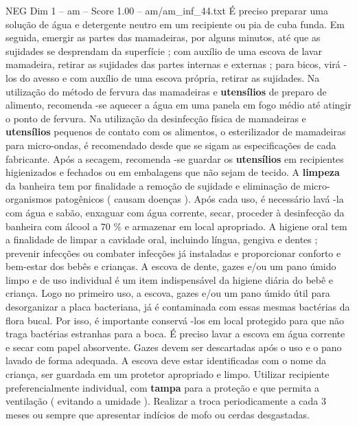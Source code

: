 \begin{textsample}{NEG Dim 1 – am – Score 1.00 – am/am\_inf\_44.txt}
É preciso preparar uma solução de água e detergente neutro em um recipiente ou pia de cuba funda.
Em seguida, emergir as partes das mamadeiras, por alguns minutos, até que as sujidades se desprendam da superfície ; com auxílio de uma escova de lavar mamadeira, retirar as sujidades das partes internas e externas ; para bicos, virá -los do avesso e com auxílio de uma escova própria, retirar as sujidades.
Na utilização do método de fervura das mamadeiras e \textbf{utensílios} de preparo de alimento, recomenda -se aquecer a água em uma panela em fogo médio até atingir o ponto de fervura.
Na utilização da desinfecção física de mamadeiras e \textbf{utensílios} pequenos de contato com os alimentos, o esterilizador de mamadeiras para micro-ondas, é recomendado desde que se sigam as especificações de cada fabricante.
Após a secagem, recomenda -se guardar os \textbf{utensílios} em recipientes higienizados e fechados ou em embalagens que não sejam de tecido.
A \textbf{limpeza} da banheira tem por finalidade a remoção de sujidade e eliminação de micro-organismos patogênicos ( causam doenças ).
Após cada uso, é necessário lavá -la com água e sabão, enxaguar com água corrente, secar, proceder à desinfecção da banheira com álcool a 70 \% e armazenar em local apropriado.
A higiene oral tem a finalidade de limpar a cavidade oral, incluindo língua, gengiva e dentes ; prevenir infecções ou combater infecções já instaladas e proporcionar conforto e bem-estar dos bebês e crianças.
A escova de dente, gazes e/ou um pano úmido limpo e de uso individual é um item indispensável da higiene diária do bebê e criança.
Logo no primeiro uso, a escova, gazes e/ou um pano úmido útil para desorganizar a placa bacteriana, já é contaminada com essas mesmas bactérias da flora bucal.
Por isso, é importante conservá -los em local protegido para que não traga bactérias estranhas para a boca.
É preciso lavar a escova em água corrente e secar com papel absorvente.
Gazes devem ser descartadas após o uso e o pano lavado de forma adequada.
A escova deve estar identificadas com o nome da criança, ser guardada em um protetor apropriado e limpo.
Utilizar recipiente preferencialmente individual, com \textbf{tampa} para a proteção e que permita a ventilação ( evitando a umidade ).
Realizar a troca periodicamente a cada 3 meses ou sempre que apresentar indícios de mofo ou cerdas desgastadas.

\end{textsample}
